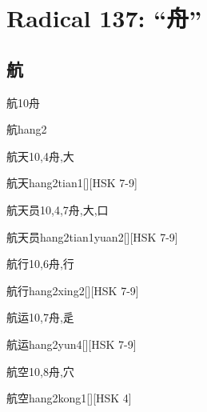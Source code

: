 \section*{Radical 137: ``⾈''}

\subsection*{航}

\begin{Entry}{航}{10}{⾈}
  \begin{Phonetics}{航}{hang2}
  \end{Phonetics}
\end{Entry}

\begin{Entry}{航天}{10,4}{⾈,⼤}
  \begin{Phonetics}{航天}{hang2tian1}[][HSK 7-9]
  \end{Phonetics}
\end{Entry}

\begin{Entry}{航天员}{10,4,7}{⾈,⼤,⼝}
  \begin{Phonetics}{航天员}{hang2tian1yuan2}[][HSK 7-9]
  \end{Phonetics}
\end{Entry}

\begin{Entry}{航行}{10,6}{⾈,⾏}
  \begin{Phonetics}{航行}{hang2xing2}[][HSK 7-9]
  \end{Phonetics}
\end{Entry}

\begin{Entry}{航运}{10,7}{⾈,⾡}
  \begin{Phonetics}{航运}{hang2yun4}[][HSK 7-9]
  \end{Phonetics}
\end{Entry}

\begin{Entry}{航空}{10,8}{⾈,⽳}
  \begin{Phonetics}{航空}{hang2kong1}[][HSK 4]
  \end{Phonetics}
\end{Entry}

